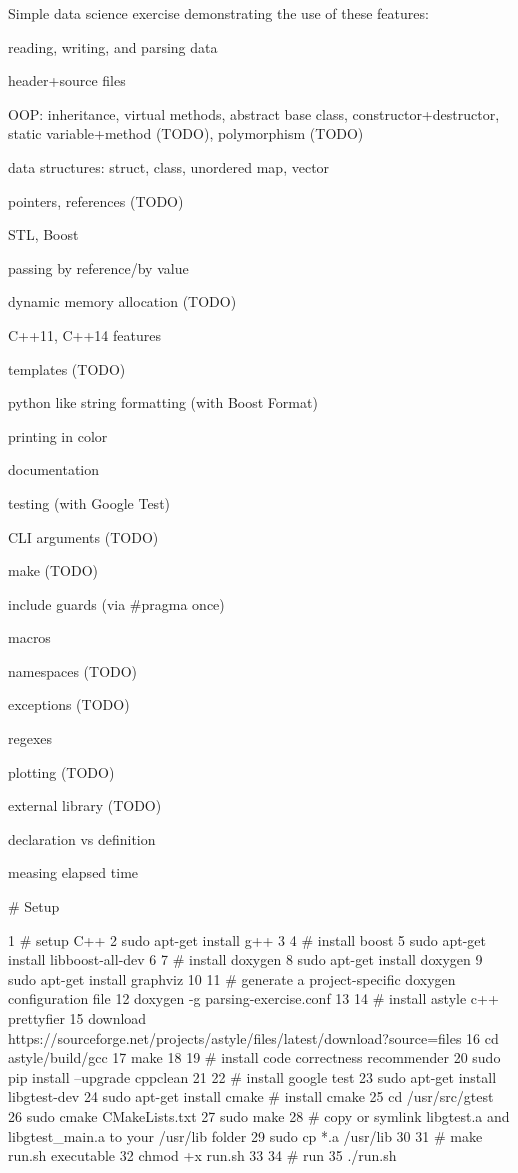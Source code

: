 Simple data science exercise demonstrating the use of these features\+:


\begin{DoxyItemize}
\item reading, writing, and parsing data
\item header+source files
\item O\+OP\+: inheritance, virtual methods, abstract base class, constructor+destructor, static variable+method (T\+O\+DO), polymorphism (T\+O\+DO)
\item data structures\+: struct, class, unordered map, vector
\item pointers, references (T\+O\+DO)
\item S\+TL, Boost
\item passing by reference/by value
\item dynamic memory allocation (T\+O\+DO)
\item C++11, C++14 features
\item templates (T\+O\+DO)
\item python like string formatting (with Boost Format)
\item printing in color
\item documentation
\item testing (with Google Test)
\item C\+LI arguments (T\+O\+DO)
\item make (T\+O\+DO)
\item include guards (via \#pragma once)
\item macros
\item namespaces (T\+O\+DO)
\item exceptions (T\+O\+DO)
\item regexes
\item plotting (T\+O\+DO)
\item external library (T\+O\+DO)
\item declaration vs definition
\item measing elapsed time
\end{DoxyItemize}

\# Setup 
\begin{DoxyCode}
1 # setup C++
2 sudo apt-get install g++
3 
4 # install boost
5 sudo apt-get install libboost-all-dev
6 
7 # install doxygen
8 sudo apt-get install doxygen
9 sudo apt-get install graphviz
10 
11 # generate a project-specific doxygen configuration file
12 doxygen -g parsing-exercise.conf
13 
14 # install astyle c++ prettyfier
15 download https://sourceforge.net/projects/astyle/files/latest/download?source=files
16 cd astyle/build/gcc
17 make
18 
19 # install code correctness recommender
20 sudo pip install --upgrade cppclean
21 
22 # install google test
23 sudo apt-get install libgtest-dev
24 sudo apt-get install cmake # install cmake
25 cd /usr/src/gtest
26 sudo cmake CMakeLists.txt
27 sudo make
28 # copy or symlink libgtest.a and libgtest\_main.a to your /usr/lib folder
29 sudo cp *.a /usr/lib
30 
31 # make run.sh executable
32 chmod +x run.sh
33 
34 # run
35 ./run.sh
\end{DoxyCode}


